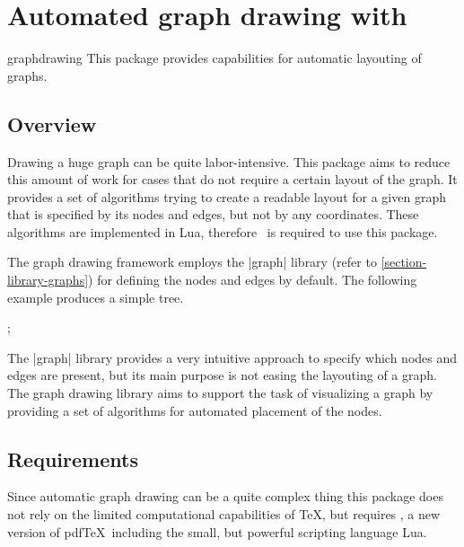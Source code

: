 %
%
%

\section{Automated graph drawing with \tikzname}
{} 
\label{section-library-graphdrawing}

\begin{tikzlibrary}{graphdrawing}
This package provides capabilities for automatic layouting of graphs.
\end{tikzlibrary}

\subsection{Overview}
Drawing a huge graph can be quite labor-intensive. This package aims to reduce
this amount of work for cases that do not require a certain layout of the graph.
It provides a set of algorithms trying to create a readable layout for a given
graph that is specified by its nodes and edges, but not by any coordinates.
These algorithms are implemented in Lua, therefore \LuaTeX\ is required
to use this package.  

The graph drawing framework employs the |graph| library (refer to
\ref{section-library-graphs}) for defining the nodes and edges by
default. The following example produces a simple tree.

\begin{codeexample}[]
\tikzpicture[graph drawing=standard tree]
  ;
\endtikzpicture
\end{codeexample}

The |graph| library provides a very intuitive approach to specify which nodes and edges are present, but its main purpose is not easing the layouting of a graph. The graph drawing library aims to support the task of visualizing a graph by providing a set of algorithms for automated placement of the nodes. 

\subsection{Requirements}
Since automatic graph drawing can be a quite complex thing this package does not
rely on the limited computational capabilities of \TeX, but requires \LuaTeX, a
new version of pdf\TeX\ including the small, but powerful scripting language Lua.

